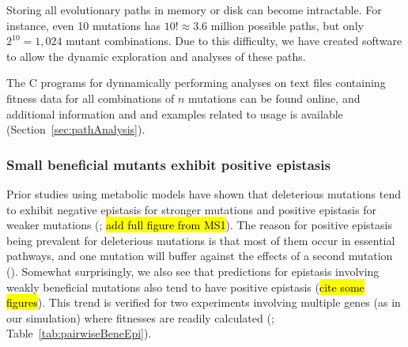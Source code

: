 Storing all evolutionary paths in memory or disk can become 
intractable. For instance, even 10 mutations has $10! \approx
3.6$ million possible paths, but only $2^{10} = 1,024$ mutant
combinations. Due to this difficulty, we have created software to allow 
the dynamic exploration and analyses of these paths. 

The C programs for dynnamically performing analyses on text files
containing fitness data for all combinations of $n$ mutations can be
found online, and additional information and and examples related to
usage is available (\suppOrApp Section~\ref{sec:pathAnalysis}).

\subsubsection{Small beneficial mutants exhibit positive epistasis}

Prior studies using metabolic models have shown that deleterious
mutations tend to exhibit negative epistasis for stronger mutations
and positive epistasis for weaker mutations (\citep{He2010, Xu2012};
\hl{add full figure from MS1}). The reason for positive epistasis
being prevalent for deleterious mutations is that most of them occur
in essential pathways, and one mutation will buffer against the
effects of a second mutation (\citep{Xu2012}). Somewhat surprisingly,
we also see that predictions for epistasis involving weakly beneficial
mutations also tend to have positive epistasis (\hl{cite some
figures}). This trend is verified for two experiments involving
multiple genes (as in our simulation) where fitnesses are readily
calculated (\citep{Chou2011, Khan2011}; Table~\ref{tab:pairwiseBeneEpi}).

